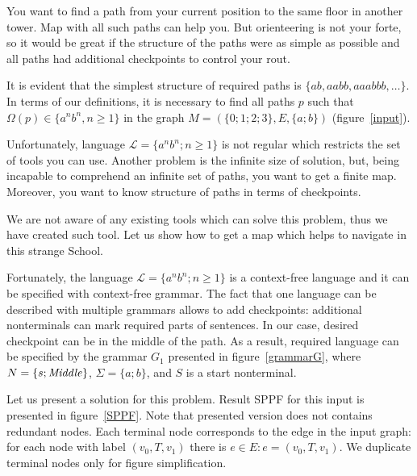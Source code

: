 You want to find a path from your current position to the same floor in another tower. 
Map with all such paths can help you.
But orienteering is not your forte, so it would be great if the structure of the paths were as simple as possible and all paths had additional checkpoints to control your rout.

It is evident that the simplest structure of required paths is $\{ab, aabb, aaabbb, \dots\}$.
In terms of our definitions, it is necessary to find all paths $p$ such that $\Omega(p) \in \{a^n b^n, n \geq 1\}$ in the graph $M=(\{0;1;2;3\},E,\{a;b\})$ (figure~\ref{input}).

Unfortunately, language $\mathcal{L} = \{a^n b^n; n \geq 1\}$ is not regular which restricts the set of tools you can use. 
Another problem is the infinite size of solution, but, being incapable to comprehend an infinite set of paths, you want to get a finite map.  
Moreover, you want to know structure of paths in terms of checkpoints.

We are not aware of any existing tools which can solve this problem, thus we have created such tool.
Let us show how to get a map which helps to navigate in this strange School.

Fortunately, the language $\mathcal{L} = \{a^n b^n; n \geq 1\}$ is a context-free language and it can be specified with context-free grammar. 
The fact that one language can be described with multiple grammars allows to add checkpoints: additional nonterminals can mark required parts of sentences.
In our case, desired checkpoint can be in the middle of the path.
As a result, required language can be specified by the grammar $G_1$ presented in figure~\ref{grammarG}, where $N = \{s; \text{\textit{Middle}}\}$, $\Sigma = \{a; b\}$, and $S$ is a start nonterminal.

Let us present a solution for this problem.
Result SPPF for this input is presented in figure~\ref{SPPF}. Note that presented version does not contains redundant nodes.
Each terminal node corresponds to the edge in the input graph: for each node with label $(v_0, T, v_1)$ there is $e\in E: e=(v_0,T,v_1)$.
We duplicate terminal nodes only for figure simplification.


